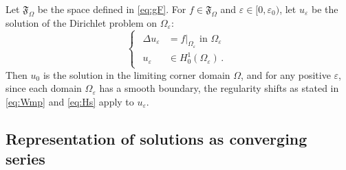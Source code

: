 \documentclass[titlepage,12pt]{amsart}
\theoremstyle{definition}
\theoremstyle{remark}
\numberwithin{equation}{section}
\newcommand{\on}[1]{\big|_{#1}}
\newcommand {\gF}{\mathfrak{F}}
\begin{document}
Let $\gF_\Omega$ be the space defined in \eqref{eq:gF}. For $f\in\gF_\Omega$ and $\varepsilon\in[0,\varepsilon_0)$, let $u_\varepsilon$ be the solution of the Dirichlet problem on $\Omega_\varepsilon$:
\begin{equation}
\label{eq:pbeps}
 \begin{cases}
   \begin{array}{rl}
   \Delta u_\varepsilon &= f\on{\Omega_\varepsilon} \text{ in }\Omega_\varepsilon\\
   u_\varepsilon &\in   H^1_0(\Omega_\varepsilon)\,.
  \end{array}
 \end{cases}
\end{equation}
Then $u_0$ is the solution in the limiting corner domain $\Omega$, and for any positive $\varepsilon$,
since each domain $\Omega_\varepsilon$ has a smooth boundary, the regularity shifts as stated in \eqref{eq:Wmp} and \eqref{eq:Hs} apply to $u_\varepsilon$. 


\subsection{Representation of solutions as converging series}
\end{document}
